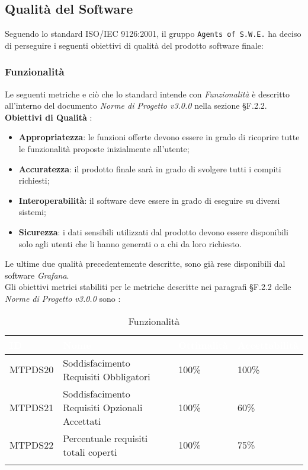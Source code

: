 \subsection{Qualità del Software}
\label{qs}
Seguendo lo standard ISO/IEC 9126:2001, il gruppo \texttt{Agents of S.W.E.} ha deciso di perseguire i seguenti obiettivi di qualità del prodotto software finale:

\subsubsection{Funzionalità}
\label{func}
Le seguenti metriche e ciò che lo standard intende con \textit{Funzionalità} è descritto all'interno del documento \textit{Norme di Progetto v3.0.0} nella sezione §F.2.2.\\

\textbf{Obiettivi di Qualità} :
\begin{itemize}
	\item \textbf{Appropriatezza}: le funzioni offerte devono essere in grado di ricoprire tutte le funzionalità proposte inizialmente all'utente;
	\item \textbf{Accuratezza}: il prodotto finale sarà in grado di svolgere tutti i compiti richiesti;
	\item \textbf{Interoperabilità}: il software deve essere in grado di eseguire su diversi sistemi;
	\item \textbf{Sicurezza}: i dati sensibili utilizzati dal prodotto devono essere disponibili solo agli utenti che li hanno generati o a chi da loro richiesto. 
\end{itemize}
Le ultime due qualità precedentemente descritte, sono già rese disponibili dal software \textit{Grafana}. \\
Gli obiettivi metrici stabiliti per le metriche descritte nei paragrafi §F.2.2 delle \textit{Norme di Progetto v3.0.0} sono : 

\begin{longtable}{|C{.15\textwidth}|C{.24\textwidth}|C{.24\textwidth}|C{.24\textwidth}|}
\hline
{}\textbf{\textcolor{white}{ID}} & \textbf{\textcolor{white}{Nome}} & \textbf{\textcolor{white}{Ottimalità}} & \textbf{\textcolor{white}{Accettabilità}}\\
\hline
MTPDS20 & Soddisfacimento Requisiti Obbligatori & 100\% & 100\%\\
\hline
{}MTPDS21 & Soddisfacimento Requisiti Opzionali Accettati & 100\% & 60\% \\
\hline
MTPDS22 & Percentuale requisiti totali coperti & 100\% & 75\% \\ 
\hline
\caption{Funzionalità}
\label{Funzionalità}
\end{longtable}

